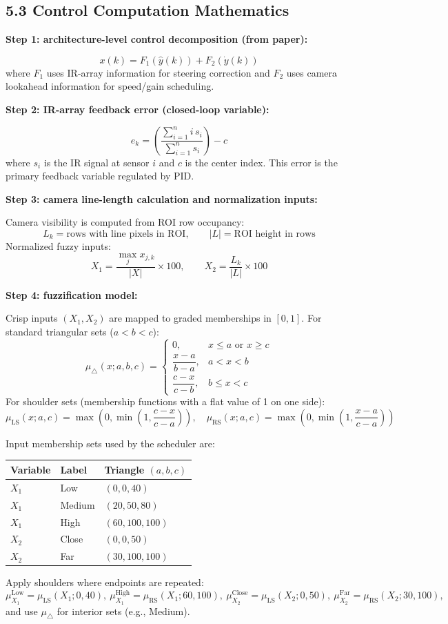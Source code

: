 \documentclass{article}
\begin{document}
\subsection*{5.3 Control Computation Mathematics}
\noindent\textbf{Step 1: architecture-level control decomposition (from paper):}\par
\[
x(k)=F_1(\hat{y}(k))+F_2(\dot{y}(k))
\]
\noindent where $F_1$ uses IR-array information for steering correction and $F_2$ uses camera lookahead information for speed/gain scheduling.

\noindent\textbf{Step 2: IR-array feedback error (closed-loop variable):}\par
\[
e_k=\left(\frac{\sum_{i=1}^{n} i\,s_i}{\sum_{i=1}^{n} s_i}\right)-c
\]
\noindent where $s_i$ is the IR signal at sensor $i$ and $c$ is the center index. This error is the primary feedback variable regulated by PID.

\noindent\textbf{Step 3: camera line-length calculation and normalization inputs:}\par
\noindent Camera visibility is computed from ROI row occupancy:
\[
L_k=\text{rows with line pixels in ROI},\qquad |L|=\text{ROI height in rows}
\]
\noindent Normalized fuzzy inputs:
\[
X_1=\frac{\max_j x_{j,k}}{|X|}\times100,\qquad
X_2=\frac{L_k}{|L|}\times100
\]

\noindent\textbf{Step 4: fuzzification model:}\par
\noindent Crisp inputs $(X_1,X_2)$ are mapped to graded memberships in $[0,1]$.
\noindent For standard triangular sets ($a<b<c$):
\[
\mu_{\triangle}(x;a,b,c)=
\begin{cases}
0,& x\le a \text{ or } x\ge c\\
\dfrac{x-a}{b-a},& a<x<b\\
\dfrac{c-x}{c-b},& b\le x<c
\end{cases}
\]
\noindent For shoulder sets (membership functions with a flat value of 1 on one side):
\[
\mu_{\text{LS}}(x;a,c)=\max\!\left(0,\min\!\left(1,\frac{c-x}{c-a}\right)\right),\quad
\mu_{\text{RS}}(x;a,c)=\max\!\left(0,\min\!\left(1,\frac{x-a}{c-a}\right)\right)
\]

\noindent Input membership sets used by the scheduler are:
\begin{center}
\begin{tabular}{lll}
\toprule
Variable & Label & Triangle $(a,b,c)$ \\
\midrule
$X_1$ & Low & $(0,0,40)$ \\
$X_1$ & Medium & $(20,50,80)$ \\
$X_1$ & High & $(60,100,100)$ \\
$X_2$ & Close & $(0,0,50)$ \\
$X_2$ & Far & $(30,100,100)$ \\
\bottomrule
\end{tabular}
\end{center}
\noindent Apply shoulders where endpoints are repeated:
\[
\mu_{X_1}^{\text{Low}}=\mu_{\text{LS}}(X_1;0,40),\ 
\mu_{X_1}^{\text{High}}=\mu_{\text{RS}}(X_1;60,100),\ 
\mu_{X_2}^{\text{Close}}=\mu_{\text{LS}}(X_2;0,50),\ 
\mu_{X_2}^{\text{Far}}=\mu_{\text{RS}}(X_2;30,100),
\]
\noindent and use $\mu_{\triangle}$ for interior sets (e.g., Medium).
\end{document}
